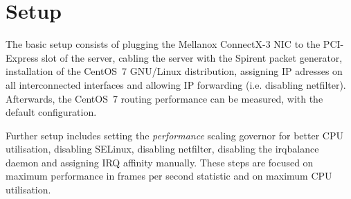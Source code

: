 
\chapter{Setup}\label{chap:setup}
The basic setup consists of plugging the Mellanox ConnectX-3 NIC to the PCI-Express slot of the server,
cabling the server with the Spirent packet generator,
installation of the CentOS~7 GNU/Linux distribution, assigning IP adresses on all interconnected interfaces
and allowing IP forwarding (i.e. disabling netfilter).
Afterwards, the CentOS~7 routing performance can be measured, with the default configuration.

Further setup includes setting the {\it{performance}} scaling governor for better CPU utilisation,
disabling SELinux, disabling netfilter,
disabling the irqbalance daemon and assigning IRQ affinity manually.
These steps are focused on maximum performance in frames per second statistic
and on maximum CPU utilisation.









